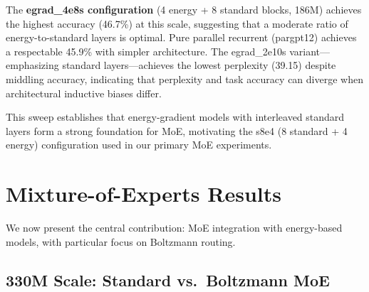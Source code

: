 \documentclass[oneside]{article}
\begin{document}
The \textbf{egrad\_4e8s configuration} (4 energy + 8 standard blocks, 186M) achieves the highest accuracy (46.7\%) at this scale, suggesting that a moderate ratio of energy-to-standard layers is optimal. Pure parallel recurrent (pargpt12) achieves a respectable 45.9\% with simpler architecture. The egrad\_2e10s variant---emphasizing standard layers---achieves the lowest perplexity (39.15) despite middling accuracy, indicating that perplexity and task accuracy can diverge when architectural inductive biases differ.

This sweep establishes that energy-gradient models with interleaved standard layers form a strong foundation for MoE, motivating the s8e4 (8 standard + 4 energy) configuration used in our primary MoE experiments.


\section{Mixture-of-Experts Results}
\label{sec:moe}

We now present the central contribution: MoE integration with energy-based models, with particular focus on Boltzmann routing.

\subsection{330M Scale: Standard vs.\ Boltzmann MoE}
\label{sec:moe_330m}
\end{document}
